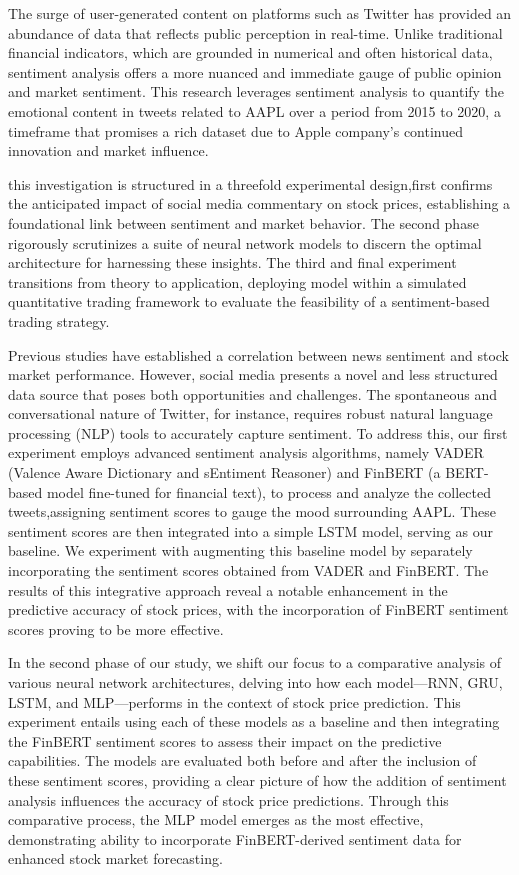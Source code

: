 \documentclass[11pt,a4paper]{article}
\begin{document}
The surge of user-generated content on platforms such as Twitter has provided an abundance of data that reflects public perception in real-time. Unlike traditional financial indicators, which are grounded in numerical and often historical data, sentiment analysis offers a more nuanced and immediate gauge of public opinion and market sentiment. This research leverages sentiment analysis to quantify the emotional content in tweets related to AAPL over a period from 2015 to 2020, a timeframe that promises a rich dataset due to Apple company's continued innovation and market influence.

 this investigation is  structured in a threefold experimental design,first confirms the anticipated impact of social media commentary on stock prices, establishing a foundational link between sentiment and market behavior. The second phase rigorously scrutinizes a suite of neural network models to discern the optimal architecture for harnessing these insights.  The third and final experiment transitions from theory to application, deploying  model within a simulated quantitative trading framework to evaluate the feasibility of a sentiment-based trading strategy.

Previous studies have established a correlation between news sentiment and stock market performance. However, social media presents a novel and less structured data source that poses both opportunities and challenges. The spontaneous and conversational nature of Twitter, for instance, requires robust natural language processing (NLP) tools to accurately capture sentiment. To address this, our first experiment employs advanced sentiment analysis algorithms, namely VADER (Valence Aware Dictionary and sEntiment Reasoner) and FinBERT (a BERT-based model fine-tuned for financial text), to process and analyze the collected tweets,assigning sentiment scores to gauge the mood surrounding AAPL. These sentiment scores are then integrated into a simple LSTM model, serving as our baseline. We experiment with augmenting this baseline model by separately incorporating the sentiment scores obtained from VADER and FinBERT. The results of this integrative approach reveal a notable enhancement in the predictive accuracy of stock prices, with the incorporation of FinBERT sentiment scores proving to be more effective.

In the second phase of our study, we shift our focus to a comparative analysis of various neural network architectures, delving into how each model—RNN, GRU, LSTM, and MLP—performs in the context of stock price prediction. This experiment entails using each of these models as a baseline and then integrating the FinBERT sentiment scores to assess their impact on the predictive capabilities. The models are evaluated both before and after the inclusion of these sentiment scores, providing a clear picture of how the addition of sentiment analysis influences the accuracy of stock price predictions. Through this comparative process, the MLP model emerges as the most effective, demonstrating ability to incorporate FinBERT-derived sentiment data for enhanced stock market forecasting.
\end{document}
